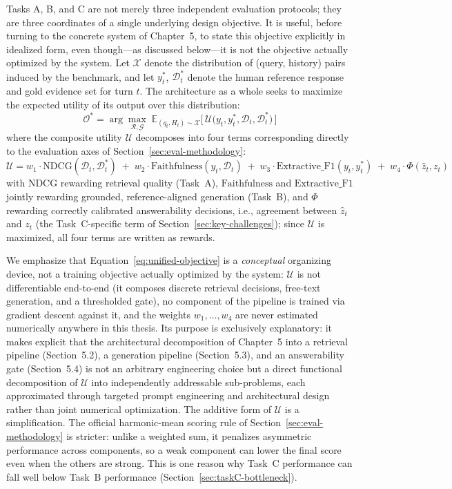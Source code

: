 Tasks A, B, and C are not merely three independent evaluation protocols; they are three coordinates of a single underlying design objective. It is useful, before turning to the concrete system of Chapter~5, to state this objective explicitly in idealized form, even though---as discussed below---it is not the objective actually optimized by the system. Let $\mathcal{X}$ denote the distribution of (query, history) pairs induced by the benchmark, and let $y_t^*$, $\mathcal{D}_t^*$ denote the human reference response and gold evidence set for turn $t$. The architecture as a whole seeks to maximize the expected utility of its output over this distribution:
\begin{equation}
\mathcal{O}^* = \arg\max_{\mathcal{R}, \mathcal{G}} \; \mathbb{E}_{(q_t, H_t) \sim \mathcal{X}} \Big[ \, \mathcal{U}\big(y_t, y_t^*, \mathcal{D}_t, \mathcal{D}_t^*\big) \, \Big]
\label{eq:unified-objective}
\end{equation}
where the composite utility $\mathcal{U}$ decomposes into four terms corresponding directly to the evaluation axes of Section~\ref{sec:eval-methodology}:
\begin{equation}
\mathcal{U} = w_1 \cdot \text{NDCG}(\mathcal{D}_t, \mathcal{D}_t^*) \;+\; w_2 \cdot \text{Faithfulness}(y_t, \mathcal{D}_t) \;+\; w_3 \cdot \text{Extractive\_F1}(y_t, y_t^*) \;+\; w_4 \cdot \Phi(\hat{z}_t, z_t)
\label{eq:utility-decomposition}
\end{equation}
with $\text{NDCG}$ rewarding retrieval quality (Task~A), $\text{Faithfulness}$ and $\text{Extractive\_F1}$ jointly rewarding grounded, reference-aligned generation (Task~B), and $\Phi$ rewarding correctly calibrated answerability decisions, i.e., agreement between $\hat{z}_t$ and $z_t$ (the Task~C-specific term of Section~\ref{sec:key-challenges}); since $\mathcal{U}$ is maximized, all four terms are written as rewards.

We emphasize that Equation~\eqref{eq:unified-objective} is a \emph{conceptual} organizing device, not a training objective actually optimized by the system: $\mathcal{U}$ is not differentiable end-to-end (it composes discrete retrieval decisions, free-text generation, and a thresholded gate), no component of the pipeline is trained via gradient descent against it, and the weights $w_1, \dots, w_4$ are never estimated numerically anywhere in this thesis. Its purpose is exclusively explanatory: it makes explicit that the architectural decomposition of Chapter~5 into a retrieval pipeline (Section~5.2), a generation pipeline (Section~5.3), and an answerability gate (Section~5.4) is not an arbitrary engineering choice but a direct functional decomposition of $\mathcal{U}$ into independently addressable sub-problems, each approximated through targeted prompt engineering and architectural design rather than joint numerical optimization. The additive form of $\mathcal{U}$ is a simplification. The official harmonic-mean scoring rule of Section~\ref{sec:eval-methodology} is stricter: unlike a weighted sum, it penalizes asymmetric performance across components, so a weak component can lower the final score even when the others are strong. This is one reason why Task~C performance can fall well below Task~B performance (Section~\ref{sec:taskC-bottleneck}).


